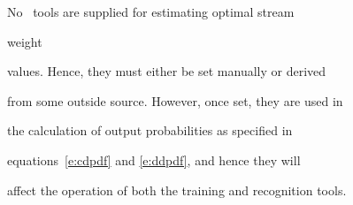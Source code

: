 




No \HTK\ tools are supplied for estimating optimal stream 


weight 


values.  Hence, they must either be set manually or derived


from some outside source.  However, once set, they are used in


the calculation of output probabilities as specified in 


equations~\ref{e:cdpdf} and \ref{e:ddpdf}, and hence they will


affect the operation of both the training and recognition tools.





